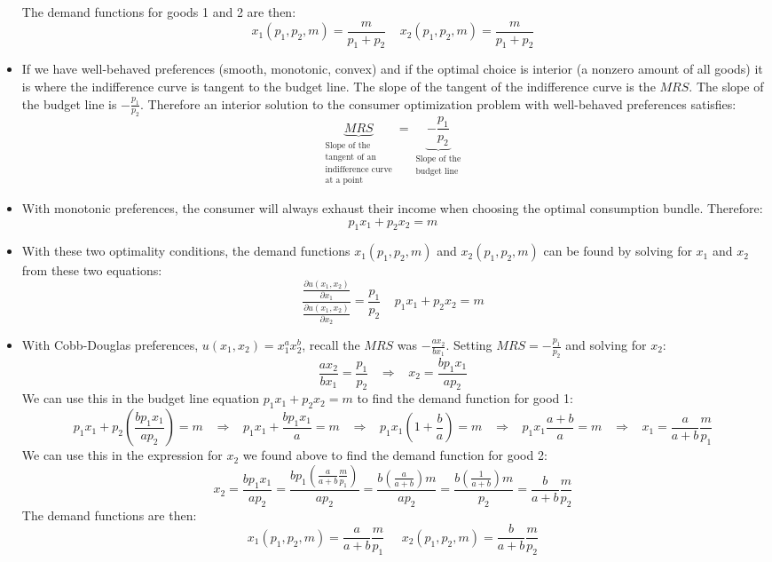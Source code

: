 \documentclass{article}
\begin{document}
\begin{itemize}
  The demand functions for goods 1 and 2 are then:
  \[
    \boxed{x_1\left( p_1,p_2,m \right)= \frac{m}{p_1+p_2}}
      \;\;\;\;
    \boxed{x_2\left( p_1,p_2,m \right)= \frac{m}{p_1+p_2}}
  \]
  \item If we have well-behaved preferences (smooth, monotonic, convex) and if the optimal choice is interior (a nonzero amount of all goods) it is where the indifference curve is tangent to the budget line. The slope of the tangent of the indifference curve is the $MRS$. The slope of the budget line is $-\frac{p_1}{p_2}$. Therefore an interior solution to the consumer optimization problem with well-behaved preferences satisfies:
  \[
  \underbrace{MRS}_{\substack{\text{Slope of the} \\ \text{tangent of
  an} \\ \text{indifference curve} \\ \text{at a
  point}}}=\underbrace{-\frac{p_1}{p_2}}_{\substack{\text{Slope of the} \\
  \text{budget line}}}
  \]
  \item With monotonic preferences, the consumer will always exhaust their income when
  choosing the optimal consumption bundle. Therefore:
  \[
    p_1x_1 + p_2x_2 = m
  \]
  \item With these two optimality conditions, the demand functions $x_1\left(
  p_1,p_2,m\right)$ and $x_2\left( p_1,p_2,m \right)$ can be found by solving for
  $x_1$ and $x_2$ from these two equations:
  \[
    \boxed{\frac{\frac{\partial u\left( x_1,x_2\right)}{\partial x_1}}
    {\frac{\partial u\left( x_1,x_2\right)}{\partial x_2}} =
  \frac{p_1}{p_2}} \;\;\;\;
  \boxed{p_1x_1 + p_2x_2 = m}
  \]
\item With Cobb-Douglas preferences, $u\left( x_1,x_2 \right)=x_1^a x_2^b$, recall the $MRS$ was $-\frac{ax_2}{bx_1}$. Setting $MRS=-\frac{p_1}{p_2}$ and solving for $x_2$:
  \begin{equation*}
    \frac{ax_2}{bx_1}=\frac{p_1}{p_2} \;\;\;\Longrightarrow \;\;\;
    x_2=\frac{bp_1x_1}{ap_2}
  \end{equation*}
  We can use this in the budget line equation $p_1x_1 + p_2x_2=m$ to find the demand function for good 1:
  \begin{equation*}
    p_1x_1+p_2\left(\frac{bp_1x_1}{ap_2}\right) = m \;\;\;\Longrightarrow \;\;\;
    p_1x_1+\frac{bp_1x_1}{a} = m \;\;\;\Longrightarrow \;\;\;
    p_1x_1\left( 1+\frac{b}{a} \right) = m \;\;\;\Longrightarrow \;\;\;
    p_1x_1\frac{a+b}{a} = m \;\;\;\Longrightarrow \;\;\;
    x_1 = \frac{a}{a+b} \frac{m}{p_1}
  \end{equation*}
  We can use this in the expression for $x_2$ we found above to find the demand function for good 2:
  \begin{equation*}
    x_2=\frac{bp_1x_1}{ap_2} =\frac{bp_1\left( \frac{a}{a+b} \frac{m}{p_1} \right) }{ap_2}=\frac{b \left(\frac{a}{a+b}\right) m}{ap_2}=\frac{b \left(\frac{1}{a+b}\right) m}{p_2}=\frac{b}{a+b}\frac{m}{p_2}
  \end{equation*}
  The demand functions are then:
    \[
  x_1\left( p_1,p_2,m \right) = \frac{a}{a+b}\frac{m}{p_1} \;\;\;\;\;
  x_2\left( p_1,p_2,m \right) = \frac{b}{a+b}\frac{m}{p_2}
  \]
\end{itemize}
\end{document}
